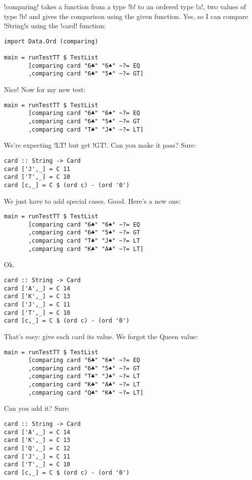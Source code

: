 \il!comparing! takes a function from a type \il!b! to an ordered type \il!a!, two values of type \il!b! and gives the comparison using the given function.
\lhN Yes, so I can compare \il!String!s using the \il!card! function:
\begin{lstlisting}[frame=single]
import Data.Ord (comparing)

main = runTestTT $ TestList 
       [comparing card "6♣" "6♠" ~?= EQ
       ,comparing card "6♣" "5♠" ~?= GT]
\end{lstlisting} %
\lhA \success Nice!
\lhN Now for my new test:
\begin{lstlisting}[frame=single]
main = runTestTT $ TestList 
       [comparing card "6♣" "6♠" ~?= EQ
       ,comparing card "6♣" "5♠" ~?= GT
       ,comparing card "T♣" "J♠" ~?= LT]
\end{lstlisting} %
\failure We're expecting \il!LT! but get \il!GT!. Can you make it pass?
\lhA
\failure Sure:
\begin{lstlisting}[frame=single]
card :: String -> Card
card ['J',_] = C 11
card ['T',_] = C 10
card [c,_] = C $ (ord c) - (ord '0')
\end{lstlisting} %
\success We just have to add special cases.
\lhN Good. Here's a new one:
\begin{lstlisting}[frame=single]
main = runTestTT $ TestList 
       [comparing card "6♣" "6♠" ~?= EQ
       ,comparing card "6♣" "5♠" ~?= GT
       ,comparing card "T♣" "J♠" ~?= LT
       ,comparing card "K♣" "A♣" ~?= LT]
\end{lstlisting} %
\lhA \failure Ok. 
\begin{lstlisting}[frame=single]
card :: String -> Card
card ['A',_] = C 14
card ['K',_] = C 13
card ['J',_] = C 11
card ['T',_] = C 10
card [c,_] = C $ (ord c) - (ord '0')
\end{lstlisting} %
\success That's easy: give each card its value.
\lhN We forgot the Queen value:
\begin{lstlisting}[frame=single]
main = runTestTT $ TestList 
       [comparing card "6♣" "6♠" ~?= EQ
       ,comparing card "6♣" "5♠" ~?= GT
       ,comparing card "T♣" "J♠" ~?= LT
       ,comparing card "K♣" "A♣" ~?= LT
       ,comparing card "Q♣" "K♣" ~?= LT]
\end{lstlisting} %
Can you add it?
\lhA \failure Sure:
\begin{lstlisting}[frame=single]
card :: String -> Card
card ['A',_] = C 14
card ['K',_] = C 13
card ['Q',_] = C 12
card ['J',_] = C 11
card ['T',_] = C 10
card [c,_] = C $ (ord c) - (ord '0')
\end{lstlisting} %
